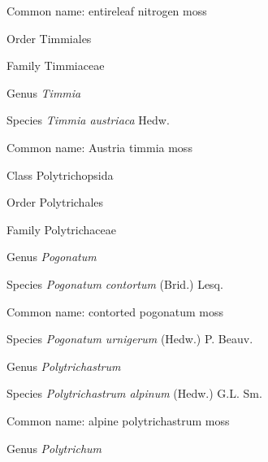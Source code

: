 \documentclass[9pt, article]{memoir}
\begin{document}
\begin{multicols}{2}
Common name: entireleaf nitrogen moss

\vspace{6pt}\noindent\hspace{18pt}Order Timmiales


\vspace{6pt}\noindent\hspace{24pt}Family Timmiaceae


\vspace{6pt}\noindent\hspace{30pt}Genus \textit{Timmia}


\vspace{6pt}\noindent\hspace{36pt}Species \textit{Timmia austriaca} Hedw.


Common name: Austria timmia moss

\vspace{6pt}\noindent\hspace{12pt}Class Polytrichopsida


\vspace{6pt}\noindent\hspace{18pt}Order Polytrichales


\vspace{6pt}\noindent\hspace{24pt}Family Polytrichaceae


\vspace{6pt}\noindent\hspace{30pt}Genus \textit{Pogonatum}


\vspace{6pt}\noindent\hspace{36pt}Species \textit{Pogonatum contortum} (Brid.) Lesq.


Common name: contorted pogonatum moss

\vspace{6pt}\noindent\hspace{36pt}Species \textit{Pogonatum urnigerum} (Hedw.) P. Beauv.


\vspace{6pt}\noindent\hspace{30pt}Genus \textit{Polytrichastrum}


\vspace{6pt}\noindent\hspace{36pt}Species \textit{Polytrichastrum alpinum} (Hedw.) G.L. Sm.


Common name: alpine polytrichastrum moss

\vspace{6pt}\noindent\hspace{30pt}Genus \textit{Polytrichum}



\end{multicols}
\end{document}
